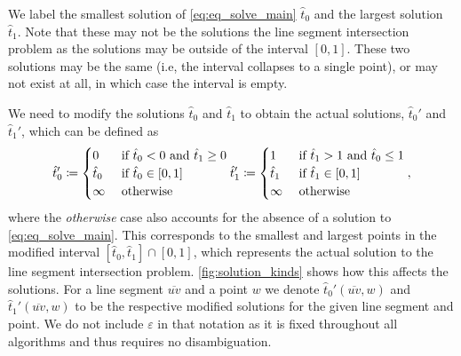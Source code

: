 We label the smallest solution of \cref{eq:eq_solve_main} \(\hat{t}_0\) and the largest solution \(\hat{t}_1\). Note that these may not be the solutions the line segment intersection problem as the solutions may be outside of the interval \([0, 1]\). These two solutions may be the same (i.e, the interval collapses to a single point), or may not exist at all, in which case the interval is empty.

We need to modify the solutions \(\hat{t}_0\) and \(\hat{t}_1\) to obtain the actual solutions, \(\hat{t}_0'\) and \(\hat{t}_1'\), which can be defined as 
\begin{equation}
  \hat{t}_0' \coloneq \begin{cases}
    0 & \textrm{ if } \hat{t}_0 < 0 \textrm{ and } \hat{t}_1 \geq 0\\
    \hat{t}_0 & \textrm{ if } \hat{t}_0 \in [0, 1]\\
    \infty &\textrm{ otherwise }
  \end{cases}\\
  \hat{t}_1' \coloneq \begin{cases}
    1 & \textrm{ if } \hat{t}_1 > 1 \textrm{ and } \hat{t}_0 \leq 1\\
    \hat{t}_1 & \textrm{ if } \hat{t}_1 \in [0, 1]\\
    \infty &\textrm{ otherwise }
  \end{cases},
\end{equation}
where the \emph{otherwise} case also accounts for the absence of a solution to \cref{eq:eq_solve_main}. This corresponds to the smallest and largest points in the modified interval \([\hat t_0, \hat t_1] \cap [0, 1]\), which represents the actual solution to the line segment intersection problem. \cref{fig:solution_kinds} shows how this affects the solutions.
For a line segment \(\overline{uv}\) and a point \(w\) we denote \(\hat t_0'(\overline{uv}, w)\) and \(\hat t_1'(\overline{uv}, w)\) to be the respective modified solutions for the given line segment and point. We do not include \(\varepsilon\) in that notation as it is fixed throughout all algorithms and thus requires no disambiguation.

